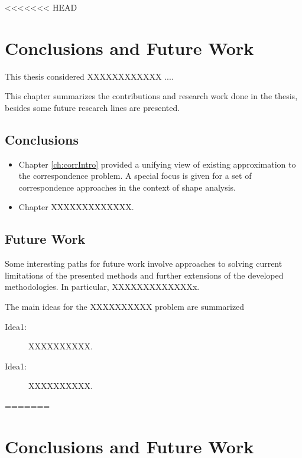 <<<<<<< HEAD


\chapter{Conclusions and Future Work}
\label{chr:Conclusions}


This thesis considered XXXXXXXXXXXX  ....

This chapter summarizes the contributions and research work done in the thesis, besides some future research lines are presented.

\section{Conclusions}

\begin{itemize}
	\item Chapter \ref{ch:corrIntro} provided a unifying view of existing approximation to the correspondence problem. A special focus
	is given for a set of correspondence approaches in the context of shape analysis.

\item Chapter XXXXXXXXXXXXX.
 
\end{itemize}


\section{Future Work}

Some interesting paths for future work involve approaches to solving current limitations of the presented methods and further extensions of the developed methodologies. In particular, XXXXXXXXXXXXXx.

The main ideas for the XXXXXXXXXX problem are summarized

\begin{description}
	\item[Idea1:] XXXXXXXXXX.
	
		\item[Idea1:] XXXXXXXXXX.
\end{description}





=======


\chapter{Conclusions and Future Work}
\label{chr:Conclusions}


